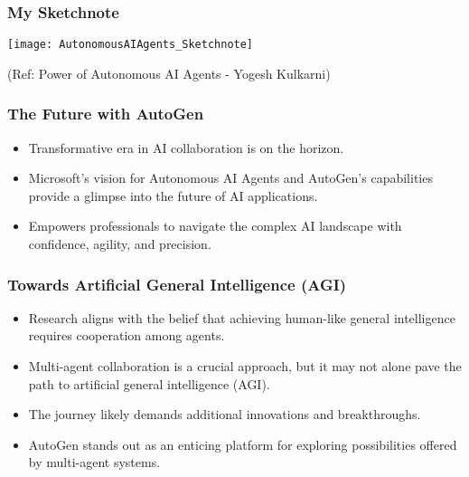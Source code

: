 \begin{frame}[fragile]\frametitle{My Sketchnote}
	
	\begin{center}
	\texttt{[image: AutonomousAIAgents\_Sketchnote]}
	\end{center}
{\tiny (Ref: Power of Autonomous AI Agents - Yogesh Kulkarni)}
\end{frame}

\begin{frame}[fragile]\frametitle{The Future with AutoGen}
  \begin{itemize}
    \item Transformative era in AI collaboration is on the horizon.
    \item Microsoft’s vision for Autonomous AI Agents and AutoGen's capabilities provide a glimpse into the future of AI applications.
    \item Empowers professionals to navigate the complex AI landscape with confidence, agility, and precision.
  \end{itemize}
\end{frame}

\begin{frame}[fragile]\frametitle{Towards Artificial General Intelligence (AGI)}
  \begin{itemize}
    \item Research aligns with the belief that achieving human-like general intelligence requires cooperation among agents.
    \item Multi-agent collaboration is a crucial approach, but it may not alone pave the path to artificial general intelligence (AGI).
    \item The journey likely demands additional innovations and breakthroughs.
	\item AutoGen stands out as an enticing platform for exploring possibilities offered by multi-agent systems.
  \end{itemize}
\end{frame}
